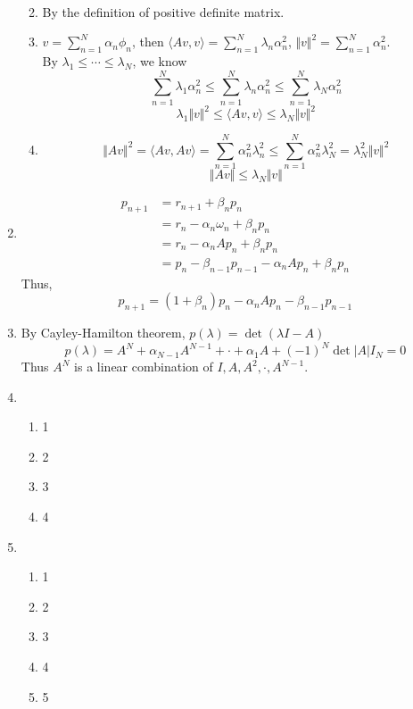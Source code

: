 \documentclass{article}
\numberwithin{equation}{section}
\begin{document}
\begin{enumerate}[label=(\alph*)]
\begin{enumerate}[label=\roman*]
\begin{align*}
            \end{align*}
            \item By the definition of positive definite matrix.
            \item $v = \sum_{n=1}^N\alpha_n \phi_n$,  then $\langle Av,v \rangle = \sum_{n=1}^N \lambda_n \alpha_n^2$, $\Vert v \Vert^2 = \sum_{n=1}^N \alpha_n^2$.\\
            By $\lambda_1 \leqslant \cdots \leqslant \lambda_N$,  we know
            $$\sum_{n=1}^N \lambda_1 \alpha_n^2 \leqslant \sum_{n=1}^N \lambda_n \alpha_n^2 \leqslant \sum_{n=1}^N \lambda_N \alpha_n^2$$
            $$\lambda_1 \Vert v \Vert^2 \leqslant \langle Av, v\rangle \leqslant \lambda_N \Vert v \Vert^2$$
            \item $$\Vert Av\Vert^2 = \langle Av, Av \rangle = \sum_{n=1}^N \alpha_n^2 \lambda_n^2 \leqslant \sum_{n=1}^N \alpha_n^2 \lambda_N^2 = \lambda_N^2 \Vert v \Vert^2 $$
            $$\Vert Av \Vert \leqslant \lambda_N \Vert v \Vert$$
        \end{enumerate}
        \item \begin{align*}
            p_{n+1}
            & = r_{n+1} + \beta_n p_n\\
            & = r_n -\alpha_n \omega_n + \beta_n p_n\\
            & = r_n - \alpha_n A p_n + \beta_n p_n\\
            & = p_n - \beta_{n-1}p_{n-1} - \alpha_n A p_n + \beta_n p_n
        \end{align*}
        Thus, $$p_{n+1} = (1+\beta_n)p_n - \alpha_n A p_n - \beta_{n-1}p_{n-1}$$
        \item By Cayley-Hamilton theorem, $p(\lambda) = \det(\lambda I -A)$
        $$p(\lambda) = A^N + \alpha_{N-1}A^{N-1} + \cdot + \alpha_1 A + (-1)^N \det |A|I_N = 0$$
        Thus $A^N$ is a linear combination of $I, A, A^2, \cdot, A^{N-1}$.
        \item \begin{enumerate}[label=\roman*]
            \item 1
            \item 2
            \item 3
            \item 4
        \end{enumerate}
        \item \begin{enumerate}[label=\roman*]
            \item 1
            \item 2
            \item 3
            \item 4
            \item 5
        \end{enumerate}
    \end{enumerate}
    
    \section{}
\end{document}
